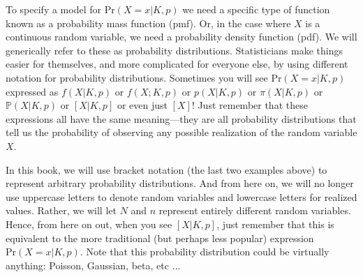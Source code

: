 To specify a model for $\text{Pr}(X=x|K,p)$ we need a specific type of
function known as a probability mass function (pmf). Or, in the case
where $X$ is a continuous random variable, we need a probability
density function (pdf). We will generically refer to these as
probability distributions.
Statisticians make things easier for themselves,
and more complicated for everyone else, by using different notation
for probability distributions. Sometimes you will see
$\text{Pr}(X=x|K,p)$ expressed as $f(X|K,p)$ or $f(X; K,p)$ or
$p(X|K,p)$ or $\pi(X|K,p)$ or $\mathbb{P}(X|K,p)$ or $[X|K,p]$ or even
just $[X]$! Just remember that these expressions all have the same
meaning---they are all probability distributions that tell us the
probability of observing any possible realization of the random
variable $X$.

In this book, we will use bracket notation (the last two
examples above) to represent arbitrary probability distributions.
And from here on, we will no longer use uppercase letters to denote
random variables and lowercase letters for realized values. %
Rather, we will let $N$ and $n$ represent entirely different random
variables.
Hence, from here on out, when you see $[X|K,p]$, just remember that
this is equivalent to the more traditional (but perhaps less popular)
expression $\text{Pr}(X=x|K,p)$. Note that this probability distribution
could be virtually anything: Poisson, Gaussian, beta, etc $\dots$

